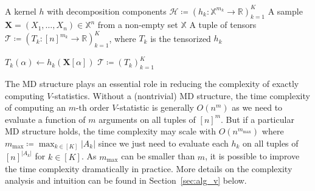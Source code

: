 \documentclass[12pt]{article}
\theoremstyle{plain}
\theoremstyle{definition}
\newcommand{\samplespace}{\bbX}
\newcommand{\less}{O}
\newcommand{\Lin}[1]{{\color{purple}{#1}}}
\newcommand{\reals}{{\mathbb{R}}}
\def\bbX{\mathbb{X}}
\def\calT{\mathcal{T}}
\def\calH{\mathcal{H}}
\begin{document}
\begin{bibunit}[agsm]
\begin{algorithm}
    \caption{Tensorization of Kernel Function}
    \label{alg:tensorization}
    \begin{algorithmic}[1]
        \Require 
            \Statex A kernel $h$ with decomposition components $\calH \coloneqq (h_k: \bbX^{m_k} \to \reals)_{k=1}^K$
            \Statex A sample $\bm{X} = (X_1, \dots, X_n) \in \samplespace^n$ from a non-empty set $\samplespace$
        \Ensure A tuple of tensors $\calT \coloneqq (T_k: [n]^{m_k} \to \reals)_{k=1}^K$, where $T_k$ is the tensorized $h_k$

        \Function{Tensorization}{$\calH, \bm{X}$}
                    \State $T_k(\alpha) \gets h_k(\bm{X}[\alpha])$  
                \EndFor
            \EndFor
            \State \Return $\calT \coloneqq (T_k)_{k=1}^K$  
        \EndFunction
    \end{algorithmic}
\end{algorithm}


The MD structure plays an essential role in reducing the complexity of exactly computing $V$-statistics. %
Without a (nontrivial) MD structure, the time complexity of computing an $m$-th order $V$-statistic is generally $\less (n^m)$ as we need to evaluate a function of $m$ arguments on all tuples of $[n]^m$. But if a particular MD structure holds, the time complexity may scale with $\less (n^{m_{\mathrm{max}}})$ where $m_{\mathrm{max}} \coloneqq \max_{k \in [K]} |A_k|$ since we just need to evaluate each  $h_k$ on all tuples of $[n]^{|A_k|}$ for $k \in [K]$. As $m_{\mathrm{max}}$ can be smaller than $m$, it is possible to improve the time complexity dramatically in practice. More details on the complexity analysis and intuition can be found in Section~\ref{sec:alg_v} below.


\end{bibunit}
\end{document}
